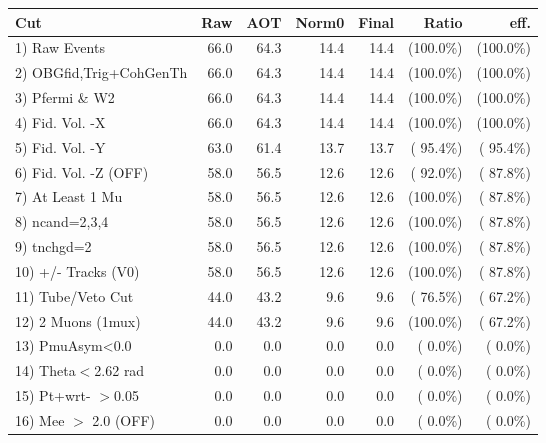  \begin{table}[h!]\centering
 \begin{tabular}{||l||r|r|r|r|r|r||}
 \hline
 \hline
 Cut & Raw & AOT & Norm0 & Final & Ratio & eff.       \\
 \hline
  1) Raw Events           &         66.0 &         64.3 &         14.4 &         14.4 & (100.0\%) & (100.0\%) \\
  2) OBGfid,Trig+CohGenTh &         66.0 &         64.3 &         14.4 &         14.4 & (100.0\%) & (100.0\%) \\
  3) Pfermi \& W2         &         66.0 &         64.3 &         14.4 &         14.4 & (100.0\%) & (100.0\%) \\
  4) Fid. Vol. -X         &         66.0 &         64.3 &         14.4 &         14.4 & (100.0\%) & (100.0\%) \\
  5) Fid. Vol. -Y         &         63.0 &         61.4 &         13.7 &         13.7 & ( 95.4\%) & ( 95.4\%) \\
  6) Fid. Vol. -Z (OFF)   &         58.0 &         56.5 &         12.6 &         12.6 & ( 92.0\%) & ( 87.8\%) \\
  7) At Least 1 Mu        &         58.0 &         56.5 &         12.6 &         12.6 & (100.0\%) & ( 87.8\%) \\
  8) ncand=2,3,4          &         58.0 &         56.5 &         12.6 &         12.6 & (100.0\%) & ( 87.8\%) \\
  9) tnchgd=2             &         58.0 &         56.5 &         12.6 &         12.6 & (100.0\%) & ( 87.8\%) \\
 10) +/- Tracks (V0)      &         58.0 &         56.5 &         12.6 &         12.6 & (100.0\%) & ( 87.8\%) \\
 11) Tube/Veto Cut        &         44.0 &         43.2 &          9.6 &          9.6 & ( 76.5\%) & ( 67.2\%) \\
 12) 2 Muons (1mux)       &         44.0 &         43.2 &          9.6 &          9.6 & (100.0\%) & ( 67.2\%) \\
 13) PmuAsym<0.0          &          0.0 &          0.0 &          0.0 &          0.0 & (  0.0\%) & (  0.0\%) \\
 14) Theta$<$2.62 rad     &          0.0 &          0.0 &          0.0 &          0.0 & (  0.0\%) & (  0.0\%) \\
 15) Pt+wrt- $>$0.05      &          0.0 &          0.0 &          0.0 &          0.0 & (  0.0\%) & (  0.0\%) \\
 16) Mee $>$ 2.0  (OFF)   &          0.0 &          0.0 &          0.0 &          0.0 & (  0.0\%) & (  0.0\%) \\

\end{tabular}
\end{table}
